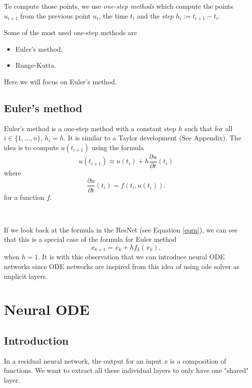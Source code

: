 \documentclass[10pt,a4paper]{article}
\theoremstyle{definition}
\theoremstyle{plain}
\begin{document}
To compute those points, we use \textit{one-step methods} which compute the points $u_{i+1}$ from the previous point $u_i$, the time $t_i$ and the \textit{step} $h_i := t_{i+1} - t_i$.

Some of the most used one-step methods are
\begin{itemize}
\item Euler's method;
\item Runge-Kutta.
\end{itemize}

Here we will focus on Euler's method.

\subsection{Euler's method} \label{euler}
Euler's method is a one-step method with a constant step $h$ such that for all $i \in \{1, \dots, n\}$, $h_i = h$. It is similar to a Taylor development (See Appendix). The idea is to compute $u(t_{i+1})$ using the formula
\begin{equation}\label{eqeuler}
u(t_{i+1}) \approx u(t_i) + h\frac{\partial u}{\partial t}(t_i)
\end{equation}
where 
$$
\frac{\partial u}{\partial t}(t_i) = f(t_i, u(t_i)).
$$
for a function $f$.

~

If we look back at the formula in the ResNet (see Equation \ref{eqrn}), we can see that this is a special case of the formula for Euler method
\begin{equation*}
x_{k+1} = x_k + hf_k(x_k),
\end{equation*}
when $h = 1$. It is with this observation that we can introduce neural ODE networks since ODE networks are inspired from this idea of using ode solver as implicit layers.



\section{Neural ODE} \label{neuralode}

\subsection{Introduction}

In a residual neural network, the output for an input $x$ is a composition of functions. We want to extract all these individual layers to only have one "shared" layer.
\end{document}
